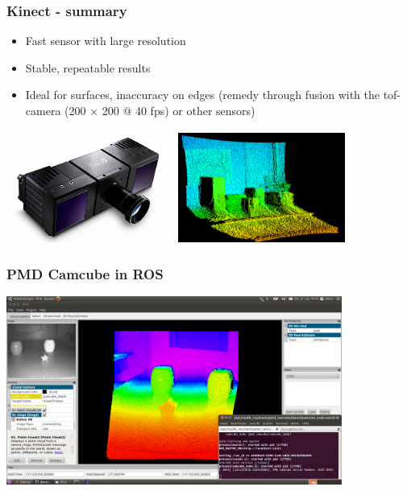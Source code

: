 \documentclass[t]{beamer}
\begin{document}
\begin{frame}
 \frametitle{Kinect - summary}
\begin{itemize}
  \item Fast sensor with large resolution
  \item Stable, repeatable results
  \item Ideal for surfaces, inaccuracy on edges (remedy through fusion with the tof-camera (200 $\times$ 200 @ 40 fps) or other sensors)
\end{itemize}
\hspace{3ex}\includegraphics[width=5.5cm]{img/camcube.png}
\includegraphics[width=5.5cm]{img/pmd2.png}
\end{frame}

\begin{frame}
 \frametitle{PMD Camcube in ROS}
\includegraphics[width=11cm]{img/camcube_ros.png}
\end{frame}
\end{document}
